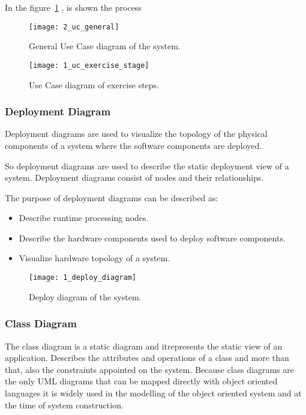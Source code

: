 In the \mbox{figure \ref{uc_general}} , is shown the process
\begin{figure}[!h]
\centering
\texttt{[image: 2\_uc\_general]}
\caption{General Use Case diagram of the system.}\label{uc_general}
\end{figure}

\begin{figure}[!h]
\centering
\texttt{[image: 1\_uc\_exercise\_stage]}
\caption{Use Case diagram of exercise steps.}\label{uc_exercise}
\end{figure}

\clearpage
\subsubsection{Deployment Diagram}
Deployment diagrams are used to visualize the topology of the physical components of a system where the software components are deployed.

So deployment diagrams are used to describe the static deployment view of a system. Deployment diagrams consist of nodes and their relationships.

The purpose of deployment diagrams can be described as:
\begin{itemize}
\item Describe runtime processing nodes.
\item Describe the hardware components used to deploy software components.
\item Visualize hardware topology of a system.
\end{itemize}




\begin{figure}[!h]
\centering
\texttt{[image: 1\_deploy\_diagram]}
\caption{Deploy diagram of the system.}\label{deploy_diagram}
\end{figure}

\clearpage

\subsubsection{Class Diagram}
The class diagram is a static diagram and itrepresents the static view of an application. Describes the attributes and operations of a class and more than that, also the constraints appointed on the system.
Because class diagrams are the only UML diagrams that can be mapped directly with object oriented languages it is widely used in the modelling of the object oriented system and at the time of system construction.

